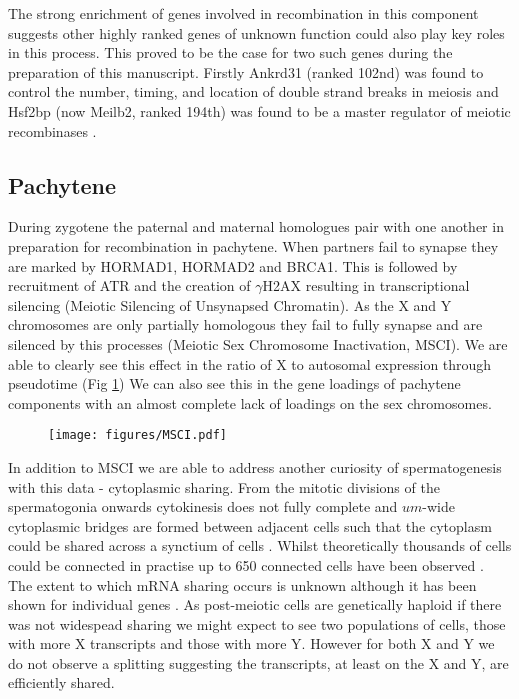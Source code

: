 The strong enrichment of genes involved in recombination in this component suggests other highly ranked genes of unknown function could also play key roles in this process. This proved to be the case for two such genes during the preparation of this manuscript. Firstly Ankrd31 (ranked 102nd) was found to control the number, timing, and location of double strand breaks in meiosis \cite{Boekhout2018-wr, Papanikos2018-jp} and Hsf2bp (now Meilb2, ranked 194th) was found to be a master regulator of meiotic recombinases \cite{Zhang2019-fb}.


\subsection{Pachytene}
During zygotene the paternal and maternal homologues pair with one another in preparation for recombination in pachytene. When partners fail to synapse they are marked by HORMAD1, HORMAD2 and BRCA1. This is followed by recruitment of ATR and the creation of $\gamma$H2AX resulting in transcriptional silencing (Meiotic Silencing of Unsynapsed Chromatin). As the X and Y chromosomes are only partially homologous they fail to fully synapse and are silenced by this processes (Meiotic Sex Chromosome Inactivation, MSCI). We are able to clearly see this effect in the ratio of X to autosomal expression through pseudotime (Fig \ref{fig:MSCI}) We can also see this in the gene loadings of pachytene components with an almost complete lack of loadings on the sex chromosomes.

\begin{figure}[H]
	\centering
	\texttt{[image: figures/MSCI.pdf]}
	\caption{}
	\label{fig:MSCI}
\end{figure}

In addition to MSCI we are able to address another curiosity of spermatogenesis with this data - cytoplasmic sharing. From the mitotic divisions of the spermatogonia onwards cytokinesis does not fully complete and $um$-wide cytoplasmic bridges are formed between adjacent cells such that the cytoplasm could be shared across a synctium of cells \cite{Greenbaum2011Germ}. Whilst theoretically thousands of cells could be connected in practise up to 650 connected cells have been observed \cite{ren1991clonal}. The extent to which mRNA sharing occurs is unknown although it has been shown for individual genes \cite{braun1989genetically}. As post-meiotic cells are genetically haploid if there was not widespead sharing we might expect to see two populations of cells, those with more X transcripts and those with more Y. However for both X and Y we do not observe a splitting suggesting the transcripts, at least on the X and Y, are efficiently shared.

